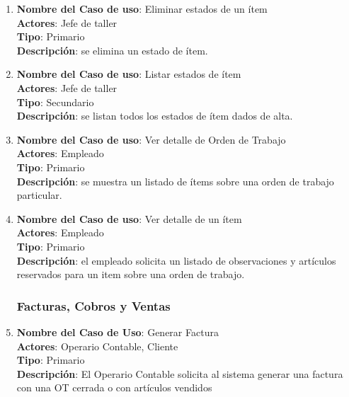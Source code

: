 \documentclass[12pt]{extarticle}
\begin{document}
\begin{spacing}{1.2}
\begin{enumerate}
            \item 	\textbf{Nombre del Caso de uso}: Eliminar estados de un ítem\\
                    \textbf{Actores}: Jefe de taller\\
                    \textbf{Tipo}: Primario\\
                    \textbf{Descripción}: se elimina un estado de ítem.
            
            \item 	\textbf{Nombre del Caso de uso}: Listar estados de ítem\\
                    \textbf{Actores}: Jefe de taller\\
                    \textbf{Tipo}: Secundario\\
                    \textbf{Descripción}: se listan todos los estados de ítem dados de alta.

            \item 	\textbf{Nombre del Caso de uso}: Ver detalle de Orden de Trabajo\\
                    \textbf{Actores}: Empleado\\
                    \textbf{Tipo}: Primario\\
                    \textbf{Descripción}: se muestra un listado de ítems sobre una orden de trabajo particular.

            \item 	\textbf{Nombre del Caso de uso}: Ver detalle de un ítem\\
                    \textbf{Actores}: Empleado\\
                    \textbf{Tipo}: Primario\\
                    \textbf{Descripción}: el empleado solicita un listado de observaciones y artículos reservados para un item sobre una orden de trabajo.



            \subsubsection{Facturas, Cobros y Ventas}



            \item 	\textbf{Nombre del Caso de Uso}: Generar Factura\\
                    \textbf{Actores}: Operario Contable, Cliente\\
                    \textbf{Tipo}: Primario\\
                    \textbf{Descripción}: El Operario Contable solicita al sistema generar una factura con una OT cerrada o con artículos vendidos


\end{enumerate}
\end{spacing}
\end{document}
